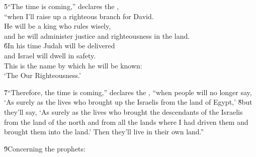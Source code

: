 \begin{poetry}
\poeml \v{5}``The time is coming,'' declares the , \\
\poemll    ``when I'll raise up a righteous branch for David. \\
\poeml He will be a king who rules wisely, \\
\poemll    and he will administer justice and righteousness in the land. \\
\poeml \v{6}In his time Judah will be delivered \\
\poemll    and Israel will dwell in safety. \\
\poeml This is the name by which he will be known: \\
\poemll    `The  Our Righteousness.'
\end{poetry}

\v{7}``Therefore, the time is coming,'' declares the , ``when people will no longer say, `As surely as the  lives who brought up the Israelis from the land of Egypt,' \v{8}but they'll say, `As surely as the  lives who brought the descendants of the Israelis from the land of the north and from all the lands where I had driven them and brought them into the land.' Then they'll live in their own land.''

\v{9}Concerning the prophets:

